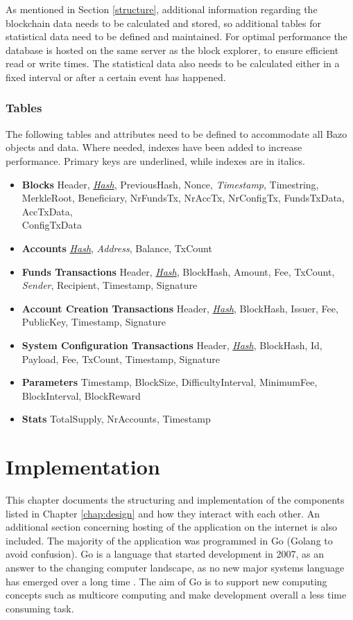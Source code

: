 As mentioned in Section \ref{structure}, additional information regarding the blockchain data needs to be calculated and stored, so additional tables for statistical data need to be defined and maintained. For optimal performance the database is hosted on the same server as the block explorer, to ensure efficient read or write times. The statistical data also needs to be calculated either in a fixed interval or after a certain event has happened.

\subsection{Tables}
The following tables and attributes need to be defined to accommodate all Bazo objects and data. Where needed, indexes have been added to increase performance. Primary keys are underlined, while indexes are in italics.
\begin{itemize}
\item \textbf{Blocks}
Header, \underline{\textit{Hash}}, PreviousHash, Nonce, \textit{Timestamp}, Timestring, MerkleRoot, Beneficiary, NrFundsTx, NrAccTx, NrConfigTx, FundsTxData, AccTxData,\\ ConfigTxData
\item \textbf{Accounts}
 \underline{\textit{Hash}}, \textit{Address}, Balance, TxCount
\item \textbf{Funds Transactions}
Header, \underline{\textit{Hash}}, BlockHash, Amount, Fee, TxCount, \textit{Sender}, Recipient, Timestamp, Signature
\item \textbf{Account Creation Transactions}
Header, \underline{\textit{Hash}}, BlockHash, Issuer, Fee,\\ PublicKey, Timestamp, Signature
\item \textbf{System Configuration Transactions}
Header, \underline{\textit{Hash}}, BlockHash, Id, Payload, Fee, TxCount, Timestamp, Signature
\item \textbf{Parameters}
Timestamp, BlockSize, DifficultyInterval, MinimumFee,\\ BlockInterval, BlockReward
\item \textbf{Stats}
TotalSupply, NrAccounts, Timestamp
\end{itemize}

\chapter{Implementation}
This chapter documents the structuring and implementation of the components listed in Chapter \ref{chap:design} and how they interact with each other. An additional section concerning hosting of the application on the internet is also included. The majority of the application was programmed in Go (Golang to avoid confusion). Go is a language that started development in 2007, as an answer to the changing computer landscape, as no new major systems language has emerged over a long time \cite{gohistory}. The aim of Go is to support new computing concepts such as multicore computing and make development overall a less time consuming task.

